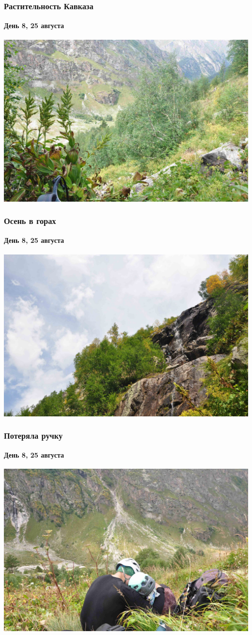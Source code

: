\begin{frame}
\frametitle{Растительность Кавказа}
	\framesubtitle{День 8, 25 августа}
	\centering
	\includegraphics[width=\textwidth]{../pics/DSC_0143}			
\end{frame}

\begin{frame}
	\frametitle{Осень в горах}
	\framesubtitle{День 8, 25 августа}
	\centering
	\includegraphics[width=\textwidth]{../pics/DSC_0149}			
\end{frame}

\begin{frame}
	\frametitle{Потеряла ручку}
	\framesubtitle{День 8, 25 августа}
	\centering
	\includegraphics[width=\textwidth]{../pics/DSC_0155}			
\end{frame}

